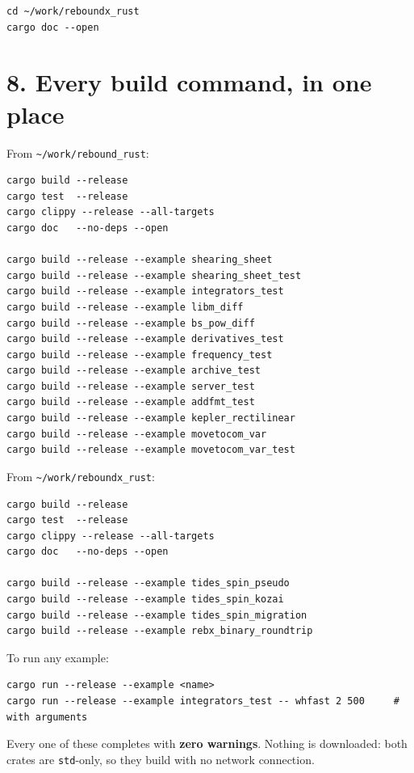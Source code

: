 \documentclass[11pt]{article}
\begin{document}
\begin{lstlisting}
cd ~/work/reboundx_rust
cargo doc --open
\end{lstlisting}

\section{8. Every build command, in one place}

From \texttt{\textasciitilde{}/work/rebound\_rust}:

\begin{lstlisting}
cargo build --release
cargo test  --release
cargo clippy --release --all-targets
cargo doc   --no-deps --open

cargo build --release --example shearing_sheet
cargo build --release --example shearing_sheet_test
cargo build --release --example integrators_test
cargo build --release --example libm_diff
cargo build --release --example bs_pow_diff
cargo build --release --example derivatives_test
cargo build --release --example frequency_test
cargo build --release --example archive_test
cargo build --release --example server_test
cargo build --release --example addfmt_test
cargo build --release --example kepler_rectilinear
cargo build --release --example movetocom_var
cargo build --release --example movetocom_var_test
\end{lstlisting}

From \texttt{\textasciitilde{}/work/reboundx\_rust}:

\begin{lstlisting}
cargo build --release
cargo test  --release
cargo clippy --release --all-targets
cargo doc   --no-deps --open

cargo build --release --example tides_spin_pseudo
cargo build --release --example tides_spin_kozai
cargo build --release --example tides_spin_migration
cargo build --release --example rebx_binary_roundtrip
\end{lstlisting}

To run any example:

\begin{lstlisting}
cargo run --release --example <name>
cargo run --release --example integrators_test -- whfast 2 500     # with arguments
\end{lstlisting}

Every one of these completes with \textbf{zero warnings}. Nothing is downloaded: both crates are \texttt{std}-only, so they build with no network connection.
\end{document}
